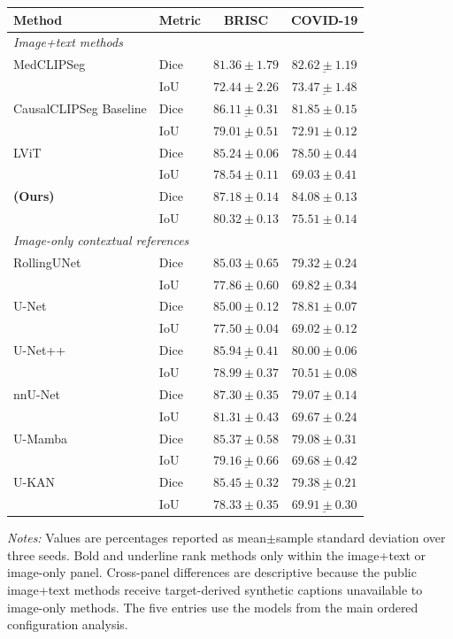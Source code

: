 \begin{table}[p]
\begin{singlespace}
\vspace{0pt}
\begin{tabular}{@{}llcc@{}}
\toprule
Method & Metric & BRISC & COVID-19 \\
\midrule
\multicolumn{4}{l}{\textit{Image+text methods}} \\
MedCLIPSeg & Dice & $81.36\pm1.79$ & $\underline{82.62\pm1.19}$ \\
 & IoU & $72.44\pm2.26$ & $\underline{73.47\pm1.48}$ \\
CausalCLIPSeg Baseline & Dice & $\underline{86.11\pm0.31}$ & $81.85\pm0.15$ \\
 & IoU & $\underline{79.01\pm0.51}$ & $72.91\pm0.12$ \\
LViT & Dice & $85.24\pm0.06$ & $78.50\pm0.44$ \\
 & IoU & $78.54\pm0.11$ & $69.03\pm0.41$ \\
\textbf{\methodname{} (Ours)} & Dice & $\mathbf{87.18\pm0.14}$ & $\mathbf{84.08\pm0.13}$ \\
 & IoU & $\mathbf{80.32\pm0.13}$ & $\mathbf{75.51\pm0.14}$ \\
\midrule
\multicolumn{4}{l}{\textit{Image-only contextual references}} \\
RollingUNet & Dice & $85.03\pm0.65$ & $79.32\pm0.24$ \\
 & IoU & $77.86\pm0.60$ & $69.82\pm0.34$ \\
U-Net & Dice & $85.00\pm0.12$ & $78.81\pm0.07$ \\
 & IoU & $77.50\pm0.04$ & $69.02\pm0.12$ \\
U-Net++ & Dice & $\underline{85.94\pm0.41}$ & $\mathbf{80.00\pm0.06}$ \\
 & IoU & $78.99\pm0.37$ & $\mathbf{70.51\pm0.08}$ \\
nnU-Net & Dice & $\mathbf{87.30\pm0.35}$ & $79.07\pm0.14$ \\
 & IoU & $\mathbf{81.31\pm0.43}$ & $69.67\pm0.24$ \\
U-Mamba & Dice & $85.37\pm0.58$ & $79.08\pm0.31$ \\
 & IoU & $\underline{79.16\pm0.66}$ & $69.68\pm0.42$ \\
U-KAN & Dice & $85.45\pm0.32$ & $\underline{79.38\pm0.21}$ \\
 & IoU & $78.33\pm0.35$ & $\underline{69.91\pm0.30}$ \\
\bottomrule
\end{tabular}
\vspace{0pt}
\begin{minipage}{0.98\linewidth}
\scriptsize\raggedright
\textit{Notes:} Values are percentages reported as mean$\pm$sample standard
deviation over three seeds. Bold and underline rank methods only within the
image+text or image-only panel. Cross-panel differences are descriptive because
the public image+text methods receive target-derived synthetic captions
unavailable to image-only methods. The five \methodname{} entries use the models
from the main ordered configuration analysis.\par
\end{minipage}
\end{singlespace}
\end{table}
